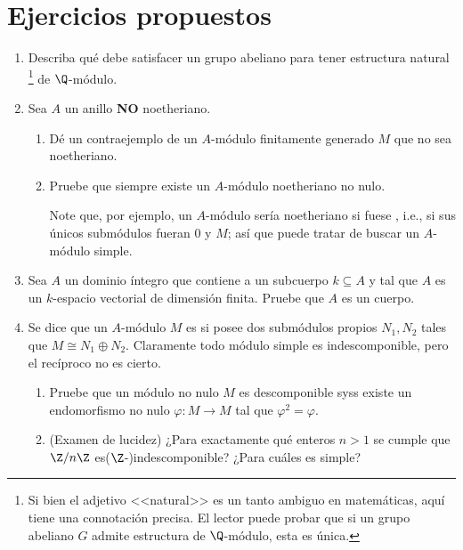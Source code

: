 \documentclass[11pt, reqno]{amsart}
\begin{document}
\appendix
\section{Ejercicios propuestos}
\begin{enumerate}
	\item Describa qué debe satisfacer un grupo abeliano para tener estructura natural%
		\footnote{Si bien el adjetivo <<natural>> es un tanto ambiguo en matemáticas, aquí tiene una connotación
		precisa. El lector puede probar que si un grupo abeliano $G$ admite estructura de $\Q$-módulo, esta es única.}
		de $\Q$-módulo.

	\item\lookup
		Sea $A$ un anillo \textbf{NO} noetheriano.
		\begin{enumerate}
			\item Dé un contraejemplo de un $A$-módulo finitamente generado $M$ que no sea noetheriano.
			\item Pruebe que siempre existe un $A$-módulo noetheriano no nulo.
				\begin{hint}
					Note que, por ejemplo, un $A$-módulo sería noetheriano si fuese ,
					i.e., si sus únicos submódulos fueran $0$ y $M$; así que puede tratar de buscar
					un $A$-módulo simple.
				\end{hint}
		\end{enumerate}

	\item Sea $A$ un dominio íntegro que contiene a un subcuerpo $k \subseteq A$ y tal que $A$ es un $k$-espacio
		vectorial de dimensión finita.
		Pruebe que $A$ es un cuerpo.

	\item Se dice que un $A$-módulo $M$ es  si posee dos submódulos propios $N_1, N_2$
		tales que $M \cong N_1 \oplus N_2$.
		Claramente todo módulo simple es indescomponible, pero el recíproco no es cierto.
		\begin{enumerate}
			\item Pruebe que un módulo no nulo $M$ es descomponible syss existe un endomorfismo no nulo
				$\varphi \colon M \to M$ tal que $\varphi^2 = \varphi$.
			\item\lookright (Examen de lucidez)
				¿Para exactamente qué enteros $n > 1$ se cumple que $\Z/n\Z$ es\break ($\Z$-)indescomponible?
				¿Para cuáles es simple?
		\end{enumerate}


\end{enumerate}
\end{document}
